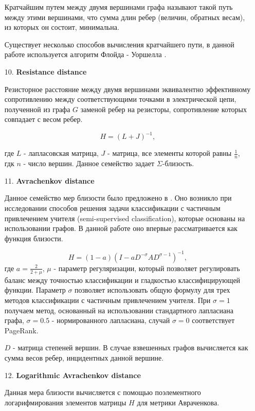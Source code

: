 \begin{itemize}
Кратчайшим путем между двумя вершинами графа называют такой путь между этими вершинами, что сумма длин ребер (величин, обратных весам), из которых он состоит, минимальна.

Существует несколько способов вычисления кратчайшего пути, в данной работе используется алгоритм Флойда - Уоршелла \cite{floyd1962algorithm}.

\item[10.] \textbf{Resistance distance}

Резисторное расстояние между двумя вершинами эквивалентно эффективному сопротивлению между соответствующими точками в электрической цепи, полученной из графа $G$ заменой ребер на резисторы, сопротивление которых совпадает с весом ребер. 

\begin{equation}
H = (L + J)^{-1},
\end{equation}
 
где $L$ - лапласовская матрица, $J$ - матрица, все элементы которой равны $\frac {1}{n}$, гдк $n$ - число вершин. Данное семейство задает $\Sigma$-близость.

\item[11.] \textbf{Avrachenkov distance}

Данное семейство мер близости было предложено в \cite{avrachenkov2012generalized}. Оно возникло при исследовании способов решения задачи классификации с частичным привлечением учителя (semi-supervised classification), которые основаны на использовании графов. В данной работе оно впервые рассматривается как функция близости.

\begin{equation}
H = (1 - a)(I - aD^{-\sigma}AD^{\sigma-1})^{-1},
\end{equation}
где $a = \frac {2}{2+\mu}$,  $\mu$ - параметр регуляризации, который позволяет регулировать баланс между точностью классификации и гладкостью классифицирующей функции. Параметр 
$\sigma$ позволяет использовать общую формулу для трех методов классификации с частичным привлечением учителя. При $\sigma = 1$ получаем метод, основанный на использовании стандартного лапласиана графа, $\sigma = 0.5$ - нормированного лапласиана,  случай $\sigma = 0$ соответствует PageRank.

$D$ - матрица степеней вершин. В случае взвешенных графов вычисляется как сумма весов ребер, инцидентных данной вершине.


\item[12.] \textbf{Logarithmic Avrachenkov distance}

Данная мера близости вычисляется с помощью поэлементного логарифмирования элементов матрицы $H$ для метрики Авраченкова. 

\end{itemize}


\clearpage
